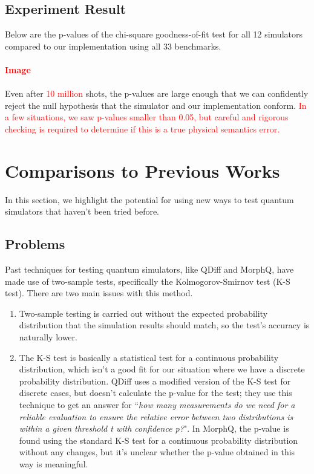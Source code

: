 \documentclass[10pt,a4paper]{article}
\newcommand{\<}{\langle}
\renewcommand{\>}{\rangle}
\newcommand{\red}[1]{\textcolor{red}{#1}}
\begin{document}
\subsection{Experiment Result}

Below are the p-values of the chi-square goodness-of-fit test for all 12 simulators compared to our
implementation using all 33 benchmarks.
\\
\\
\textbf{\red{Image}}
\\
\\
Even after \red{10 million} shots, the p-values are large enough that we can confidently reject the null
hypothesis that the simulator and our implementation conform.
\red{
In a few situations, we saw p-values smaller than 0.05, but careful and rigorous checking is
required to determine if this is a true physical semantics error.
}




\section{Comparisons to Previous Works}

In this section, we highlight the potential for using new ways to test quantum simulators that
haven't been tried before.

\subsection{Problems}
Past techniques for testing quantum simulators, like QDiff and MorphQ, have made use of two-sample
tests, specifically the Kolmogorov-Smirnov test (K-S test). There are two main issues with this
method.

\begin{enumerate}
  \item
    Two-sample testing is carried out without the expected probability distribution that the
    simulation results should match, so the test's accuracy is naturally lower.
  \item
    The K-S test is basically a statistical test for a continuous probability distribution, which
    isn't a good fit for our situation where we have a discrete probability distribution. QDiff uses
    a modified version of the K-S test for discrete cases,
    but doesn't calculate the p-value for the test; they use this technique to get an answer for
    ``\textit{how many measurements do we need for a reliable evaluation to ensure the relative error
    between two distributions is within a given threshold t with confidence p?}".
    In MorphQ, the p-value is found using the standard K-S test for a
    continuous probability distribution without any changes, but it's unclear whether the p-value
    obtained in this way is meaningful.
\end{enumerate}
\end{document}
